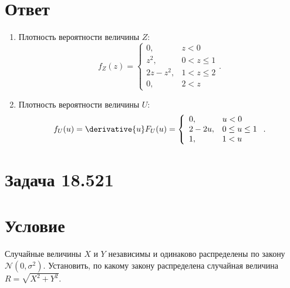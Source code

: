 \documentclass[a4paper,12pt]{article}
\begin{document}
    \section*{Ответ}
    \begin{enumerate}
        \item Плотность вероятности величины $Z$:
        $$
        f_Z(z)
        = \left \{
        \begin{array}{ll}
            0,        & z < 0       \\
            z^2,      & 0 < z \le 1 \\
            2z - z^2, & 1 < z \le 2 \\
            0,        & 2 < z
        \end{array}
        \right .
        .
        $$

        \item Плотность вероятности величины $U$:
        $$
        f_U(u)
        = \derivative{u} F_U(u)
        = \left \{
        \begin{array}{ll}
            0,      & u < 0         \\
            2 - 2u, & 0 \le u \le 1 \\
            1,      & 1 < u
        \end{array}
        \right .
        .
        $$
    \end{enumerate}


    \section{Задача 18.521}
    \section*{Условие}
    Случайные величины $X$ и $Y$ независимы и одинаково распределены по закону $\mathcal{N}(0, \sigma^2)$. Установить, по какому закону распределена случайная величина
    $R = \sqrt{X^2 + Y^2}$.
\end{document}
